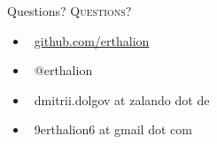 \documentclass[usenames,dvipsnames, 18pt, compress, aspectratio=169]{beamer}
\def\twitter{{\FA \faTwitter}}
\def\github{{\FA \faGithub}}
\def\email{{\FA \faEnvelope}}
\begin{document}
\fontsize{18pt}{18}\selectfont
\begin{frame}
  \vspace*{2.5cm}
  \begin{minipage}[b][\paperheight]{\textwidth}
  \begin{center}

      \linespread{1.0}%
      \if@noSmallCapitals%
        Questions?
      \else%
        \scshape{\color{black} Questions?}%
      \fi%
      \vspace*{0.3em}

      \fontsize{13pt}{14}\selectfont
        \begin{itemize}[label={}]
            \item {\color{black} \github\ \href{github.com/erthalion}
                                               {\color{black}github.com/erthalion}}
            \item {\color{black} \twitter\ @erthalion}
            \item {\color{black} \email\ dmitrii.dolgov at zalando dot de}
            \item {\color{black} \email\ 9erthalion6 at gmail dot com}
        \end{itemize}
      \vspace*{2.5em}%

    \vfill
    \vspace*{2em}
  \end{center}
  \end{minipage}

\end{frame}
\end{document}

